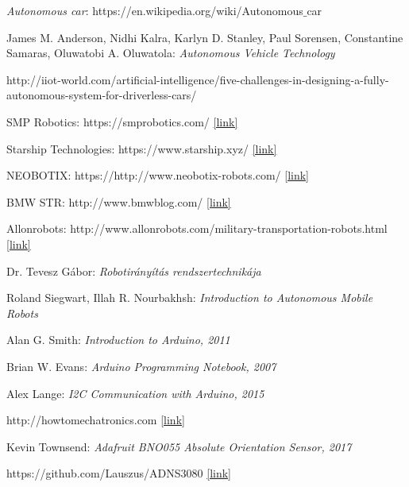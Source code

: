 \documentclass[12pt,english]{article}
\begin{document}

\newpage
\begin{thebibliography}{1}



\emph{Autonomous car}: https://en.wikipedia.org/wiki/Autonomous$\_$car 


James M. Anderson, Nidhi Kalra, Karlyn D. Stanley, Paul Sorensen, Constantine Samaras, Oluwatobi A. Oluwatola: \emph{Autonomous Vehicle Technology}

http://iiot-world.com/artificial-intelligence/five-challenges-in-designing-a-fully-autonomous-system-for-driverless-cars/

SMP Robotics: https://smprobotics.com/ \href{https://smprobotics.com/application_autonomus_mobile_robots/transport-robots/}{[link]}

Starship Technologies: https://www.starship.xyz/ \href{https://www.starship.xyz/}{[link]}

NEOBOTIX: https://http://www.neobotix-robots.com/ \href{http://www.neobotix-robots.com/}{[link]}

BMW STR: http://www.bmwblog.com/ \href{http://www.bmwblog.com/2016/11/18/bmw-logistics-now-use-autonomous-transport-robots/}{[link]}

Allonrobots: http://www.allonrobots.com/military-transportation-robots.html \href{http://www.allonrobots.com/military-transportation-robots.html}{[link]}

Dr. Tevesz Gábor:
\emph{Robotirányítás rendszertechnikája}

Roland Siegwart, Illah R. Nourbakhsh:
\emph{Introduction to Autonomous Mobile Robots}


 Alan G. Smith: \emph{Introduction to Arduino, 2011}


 Brian W. Evans: \emph{Arduino Programming Notebook, 2007}


 Alex Lange: \emph{I2C Communication with Arduino, 2015}

 http://howtomechatronics.com \href{http://howtomechatronics.com/}{[link]}

	 Kevin Townsend: \emph{Adafruit BNO055 Absolute Orientation Sensor, 2017}

	 https://github.com/Lauszus/ADNS3080 \href{https://github.com/Lauszus/ADNS3080}{[link]}
	
\end{thebibliography}
\end{document}
